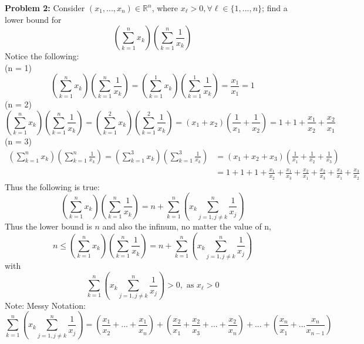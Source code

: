 \documentclass[12pt]{article}
\begin{document}
\newpage
\noindent \textbf{Problem 2: }Consider $(x_1,...,x_n) \in \mathbb{R}^n$, where $x_\ell > 0, \forall \ell \in \{1, ..., n\}$; find a lower bound for 
$$
\left( \sum_{k = 1}^{n} x_k	\right)\left( \sum_{k = 1}^{n} \frac{1}{x_k}\right)
$$ 
Notice the following:  \\
(n = 1)
$$
\left( \sum_{k = 1}^{n} x_k	\right)\left( \sum_{k = 1}^{n} \frac{1}{x_k}	\right) = \left( \sum_{k = 1}^{1} x_k	\right)\left( \sum_{k = 1}^{1} \frac{1}{x_k}	\right) = \frac{x_1}{x_1} = 1
$$
(n = 2)
$$
\left( \sum_{k = 1}^{n} x_k	\right)\left( \sum_{k = 1}^{n} \frac{1}{x_k}	\right) = \left( \sum_{k = 1}^{2} x_k	\right)\left( \sum_{k = 1}^{2} \frac{1}{x_k}	\right) = (x_1 + x_2)\left(\frac{1}{x_1} + \frac{1}{x_2}\right) = 1 + 1 + \frac{x_1}{x_2} + \frac{x_2}{x_1}
$$
(n = 3)
\begin{align*}
\left( \sum_{k = 1}^{n} x_k	\right)\left( \sum_{k = 1}^{n} \frac{1}{x_k}	\right) = \left( \sum_{k = 1}^{3} x_k	\right)\left( \sum_{k = 1}^{3} \frac{1}{x_k}	\right) &= (x_1 + x_2 + x_3)\left(\frac{1}{x_1} + \frac{1}{x_2} + \frac{1}{x_3} \right) \\
&= 1 + 1 + 1 + \frac{x_1}{x_2} + \frac{x_1}{x_3} + \frac{x_2}{x_1} + \frac{x_2}{x_3} + \frac{x_3}{x_1} + \frac{x_3}{x_2} 
\end{align*}
Thus the following is true:
$$
\left( \sum_{k = 1}^{n} x_k	\right)\left( \sum_{k = 1}^{n} \frac{1}{x_k}\right) = n + \sum_{k=1}^{n} \left(x_k \sum_{j = 1, j \not = k}^{n} \frac{1}{x_j}\right)
$$ 
Thus the lower bound is $n$ and also the infinum, no matter the value of n, 
$$
n \leq \left( \sum_{k = 1}^{n} x_k	\right)\left( \sum_{k = 1}^{n} \frac{1}{x_k}\right) = n + \sum_{k=1}^{n} \left(x_k \sum_{j = 1, j \not = k}^{n} \frac{1}{x_j}\right)  
$$ 
with 
$$
\sum_{k=1}^{n} \left(x_k \sum_{j = 1, j \not = k}^{n} \frac{1}{x_j}\right)   > 0, \text{ as }x_\ell > 0
$$
Note: Messy Notation: 
$$
\sum_{k=1}^{n} \left(x_k \sum_{j = 1, j \not = k}^{n} \frac{1}{x_j}\right)  = \left( \frac{x_1}{x_2} + ... + \frac{x_1}{x_n} \right)+ \left( \frac{x_2}{x_1} + \frac{x_2}{x_3} + ... + \frac{x_2}{x_n} \right)+ ... + \left(\frac{x_n}{x_1} + ... \frac{x_n}{x_{n-1}}\right)
$$
\newpage 
\end{document}
